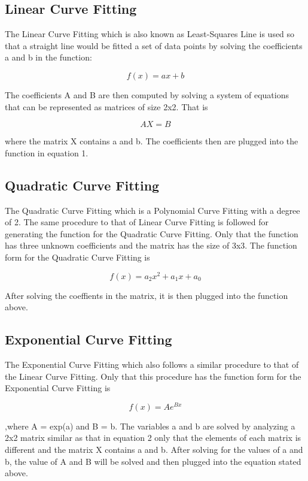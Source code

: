 \documentclass{acm_proc_article-sp}
\begin{document}
\subsection{Linear Curve Fitting}
The Linear Curve Fitting which is also known as Least-Squares Line is used so that a straight line would be fitted a set of data points by solving the coefficients a and b in the function:

\begin{equation}
f(x) = ax + b
\end{equation}

The coefficients A and B are then computed by solving a system of equations that can be represented as matrices of size 2x2. That is

\begin{equation}
AX = B
\end{equation}

where the matrix X contains a and b. The coefficients then are plugged into the function in equation 1.

\subsection{Quadratic Curve Fitting}
The Quadratic Curve Fitting which is a Polynomial Curve Fitting with a degree of 2. The same procedure to that of Linear Curve Fitting is followed for generating the function for the Quadratic Curve Fitting. Only that the function has three unknown coefficients and the matrix has the size of 3x3. The function  form for the Quadratic Curve Fitting is

\begin{equation}
f(x) = a_2x^2 + a_1x + a_0
\end{equation}

After solving the coeffients in the matrix, it is then plugged into the function above.

\subsection{Exponential Curve Fitting}
The Exponential Curve Fitting which also follows a similar procedure to that of the Linear Curve Fitting. Only that this procedure has the function form for the Exponential Curve Fitting is

\begin{equation}
f(x) = Ae^{Bx}
\end{equation}


,where A = exp(a) and B = b. The variables a and b are solved by analyzing a 2x2 matrix similar as that in equation 2 only that the elements of each matrix is different and the matrix X contains a and b. After solving for the values of a and b, the value of A and B will be solved and then plugged into the equation stated above.
\end{document}
